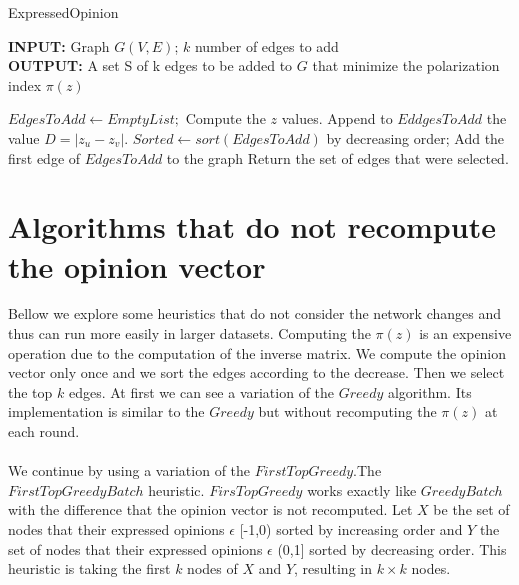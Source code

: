 \clearpage


\begin{algorithm}[H]
	\caption{ExpressedΟpinion}
	\label{alg:expressedOpinion}
	
	\begin{flushleft}
        		\textbf{INPUT:} Graph $G(V, E)$; $k$ number of edges to add\\
		\vspace{6pt}
        		\textbf{OUTPUT:} A set S of k edges to be added to $G$ that minimize the polarization
		\\ index $\pi(z)$
	\end{flushleft}
	
	\begin{algorithmic}[1]
			\STATE $EdgesToAdd \leftarrow Empty List;$
			\STATE Compute the $z$ values.
				\STATE Append to $EddgesToAdd$ the value $D=|z_u - z_v|$.
			\ENDFOR
			\STATE $Sorted \leftarrow sort(EdgesToAdd)$ by decreasing order;
			\STATE Add the first edge of $EdgesToAdd$ to the graph
		\ENDFOR
		\STATE Return the set of edges that were selected.
	\end{algorithmic}
	
\end{algorithm}

\section{Algorithms that do not recompute the opinion vector}
\label{sec:norecomputeAlgo}

Bellow we explore some heuristics that do not consider the network changes and thus can run more easily in larger datasets.
Computing the $\pi(z)$ is an expensive operation due to the computation of the inverse matrix. We compute the opinion vector only once and we sort the edges according to the decrease. Then we select the top $k$ edges. At first we can see a variation of the $Greedy$ algorithm. Its implementation is similar to the $Greedy$ but without recomputing the  $\pi(z)$ at each round. 
\\
\\We continue by using a variation of the $FirstTopGreedy$.The $FirstTopGreedyBatch$ heuristic. $FirsTopGreedy$  works exactly like $GreedyBatch$ with the difference that the opinion vector is not recomputed. Let $X$ be the set of nodes that their expressed opinions $\epsilon$ [-1,0) sorted by increasing order and $Y$ the set of nodes that their expressed opinions $\epsilon$ (0,1] sorted by decreasing order. This heuristic is taking the first $k$ nodes of $X$ and $Y$, resulting in $k \times k$ nodes.
\clearpage

